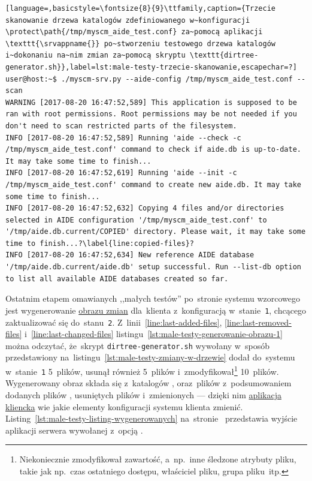 \documentclass[thesis]{subfiles}
\begin{document}
\begin{minipage}{\linewidth}
\begin{lstlisting}[language=,basicstyle=\fontsize{8}{9}\ttfamily,caption={Trzecie skanowanie drzewa katalogów zdefiniowanego w~konfiguracji \protect\path{/tmp/myscm_aide_test.conf} za~pomocą aplikacji \texttt{\srvappname{}} po~stworzeniu testowego drzewa katalogów i~dokonaniu na~nim zmian za~pomocą skryptu \texttt{dirtree-generator.sh}},label=lst:male-testy-trzecie-skanowanie,escapechar=?]
user@host:~$ ./myscm-srv.py --aide-config /tmp/myscm_aide_test.conf --scan
WARNING [2017-08-20 16:47:52,589] This application is supposed to be ran with root permissions. Root permissions may be not needed if you don't need to scan restricted parts of the filesystem.
INFO [2017-08-20 16:47:52,589] Running 'aide --check -c /tmp/myscm_aide_test.conf' command to check if aide.db is up-to-date. It may take some time to finish...
INFO [2017-08-20 16:47:52,619] Running 'aide --init -c /tmp/myscm_aide_test.conf' command to create new aide.db. It may take some time to finish...
INFO [2017-08-20 16:47:52,632] Copying 4 files and/or directories selected in AIDE configuration '/tmp/myscm_aide_test.conf' to '/tmp/aide.db.current/COPIED' directory. Please wait, it may take some time to finish...?\label{line:copied-files}?
INFO [2017-08-20 16:47:52,634] New reference AIDE database '/tmp/aide.db.current/aide.db' setup successful. Run --list-db option to list all available AIDE databases created so far.
\end{lstlisting}
\end{minipage}

Ostatnim etapem omawianych ,,małych testów'' po~stronie systemu wzorcowego jest wygenerowanie \hyperref[sec:obraz-zmian-konfiguracji]{obrazu zmian} dla~klienta z~konfiguracją w~stanie~\texttt{1}, chcącego zaktualizować się do~stanu~\texttt{2}. Z~linii~\ref{line:last-added-files}, \ref{line:last-removed-files} i~\ref{line:last-changed-files} listingu~\ref{lst:male-testy-generowanie-obrazu-1} można odczytać, że~skrypt \texttt{dirtree-generator.sh} wywołany w~sposób przedstawiony na~listingu~\ref{lst:male-testy-zmiany-w-drzewie} dodał do~systemu w~stanie~\texttt{1} 5~plików, usunął również 5~plików i~zmodyfikował\footnote{Niekoniecznie zmodyfikował zawartość, a~np.~inne śledzone atrybuty pliku, takie jak np.~czas ostatniego dostępu, właściciel pliku, grupa pliku~itp.} 10~plików. Wygenerowany obraz  składa się z~katalogów ,  oraz~plików z~podsumowaniem dodanych plików , usuniętych plików  i~zmienionych  --- dzięki nim \hyperref[sec:cli-app]{aplikacja kliencka} wie jakie elementy konfiguracji systemu klienta zmienić. Listing~\ref{lst:male-testy-listing-wygenerowanych} na~stronie~\pageref{lst:male-testy-listing-wygenerowanych} przedstawia wyjście aplikacji serwera wywołanej z~opcją .
\end{document}

